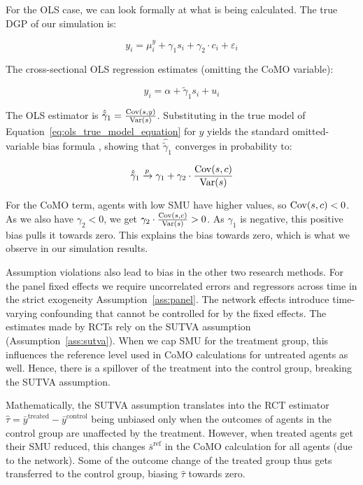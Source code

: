 For the OLS case, we can look formally at what is being calculated. The true DGP of our simulation is:

\begin{equation}
    y_i = \mu^y_i + \gamma_1 s_i + \gamma_2 \cdot c_i + \varepsilon_i
    \label{eq:ols_true_model_equation}
\end{equation}

The cross-sectional OLS regression estimates (omitting the CoMO variable):

\begin{equation}
y_i = \alpha + \tilde{\gamma}_1 s_i + u_i
\end{equation}

The OLS estimator is $\hat{\tilde{\gamma}}_1 = \frac{\operatorname{Cov}(s, y)}{\operatorname{Var}(s)}$. Substituting in the true model of Equation~\eqref{eq:ols_true_model_equation} for $y$ yields the standard omitted-variable bias formula \parencite[see][Eq.~(3.2.11), p.~60]{Angrist2009}, showing that $\hat{\tilde{\gamma}}_1$ converges in probability to:

\begin{equation}
\hat{\tilde{\gamma}}_1 \xrightarrow{p} \gamma_1 + \gamma_2 \cdot \frac{\operatorname{Cov}(s, c)}{\operatorname{Var}(s)}
\end{equation}

For the CoMO term, agents with low SMU have higher values, so $\operatorname{Cov}(s, c) < 0$. As we also have $\gamma_2 < 0$, we get $\gamma_2 \cdot \frac{\operatorname{Cov}(s, c)}{\operatorname{Var}(s)} > 0$. As $\gamma_1$ is negative, this positive bias pulls it towards zero. This explains the bias towards zero, which is what we observe in our simulation results.

Assumption violations also lead to bias in the other two research methods. For the panel fixed effects we require uncorrelated errors and regressors across time in the strict exogeneity Assumption~\ref{ass:panel}. The network effects introduce time-varying confounding that cannot be controlled for by the fixed effects. The estimates made by RCTs rely on the SUTVA assumption (Assumption~\ref{ass:sutva}). When we cap SMU for the treatment group, this influences the reference level used in CoMO calculations for untreated agents as well. Hence, there is a spillover of the treatment into the control group, breaking the SUTVA assumption.

Mathematically, the SUTVA assumption translates into the RCT estimator $\hat{\tau} = \bar{y}^{\text{treated}} - \bar{y}^{\text{control}}$ being unbiased only when the outcomes of agents in the control group are unaffected by the treatment. However, when treated agents get their SMU reduced, this changes $\bar{s}^{\text{ref}}$ in the CoMO calculation for all agents (due to the network). Some of the outcome change of the treated group thus gets transferred to the control group, biasing $\hat{\tau}$ towards zero.


